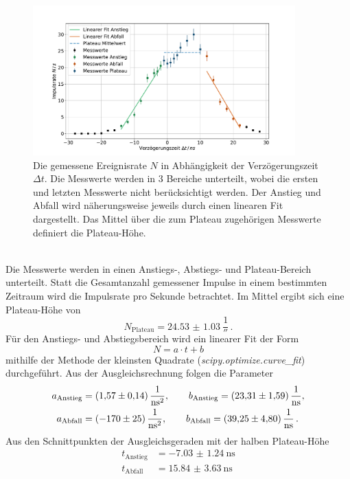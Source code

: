 \begin{figure}
    \centering
    \includegraphics[width=0.9\textwidth]{content/plots/verzoegerungszeit.pdf}
    \caption{Die gemessene Ereignisrate $N$ in Abhängigkeit der Verzögerungszeit $\Delta t$.
    Die Messwerte werden in 3 Bereiche unterteilt, wobei die ersten und letzten Messwerte nicht berücksichtigt werden.
    Der Anstieg und Abfall wird näherungsweise jeweils durch einen linearen Fit dargestellt.
    Das Mittel über die zum Plateau zugehörigen Messwerte definiert die Plateau-Höhe.}
    \label{fig:verzoegerung}
\end{figure}
\\
Die Messwerte werden in einen Anstiegs-, Abstiegs- und Plateau-Bereich unterteilt.
Statt die Gesamtanzahl gemessener Impulse in einem bestimmten Zeitraum wird die Impulsrate pro Sekunde betrachtet.
Im Mittel ergibt sich eine Plateau-Höhe von
\begin{equation}
    N_\text{Plateau} = \qty{24.53(103)}{\frac{1}{\second}} \,.
\end{equation}
Für den Anstiegs- und Abstiegsbereich wird ein linearer Fit der Form
\begin{equation*}
    N = a \cdot t + b
\end{equation*}
mithilfe der Methode der kleinsten Quadrate (\textit{scipy.optimize.curve\_fit}\cite{scipy}) durchgeführt.
Aus der Ausgleichsrechnung folgen die Parameter
\begin{align*}
    a_\text{Anstieg} &= \qty{1.57(14)}{\frac{1}{\nano\second^2}},\qquad b_\text{Anstieg} = \qty{23.31(159)}{\frac{1}{\nano\second}}, \\
    a_\text{Abfall} &= \qty{-170(25)}{\frac{1}{\nano\second^2}},\qquad b_\text{Abfall} = \qty{39.25(480)}{\frac{1}{\nano\second}} \,.
\end{align*}
Aus den Schnittpunkten der Ausgleichsgeraden mit der halben Plateau-Höhe
\begin{align*}
    t_\text{Anstieg} &= \qty{-7.03(124)}{\nano\second} \\
    t_\text{Abfall} &= \qty{15.84(363)}{\nano\second}
\end{align*}
